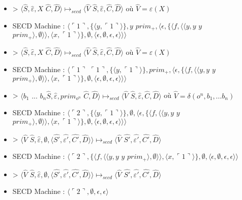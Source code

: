 \documentclass[10pt,a4paper]{article}
\begin{document}
\begin{itemize}
						\item[] > $\langle\widehat{S},\widehat{\varepsilon},X$ $\widehat{C},\widehat{D}\rangle \longmapsto_{secd} \langle \widehat{V}$ $\widehat{S},\widehat{\varepsilon},\widehat{C},\widehat{D}\rangle$ où $\widehat{V} = \varepsilon(X)$
						\item[] SECD Machine : $\langle\ulcorner 1\urcorner,\{\langle y,\ulcorner 1\urcorner\rangle\},y$ $prim_{+},\langle\epsilon,\{\langle f,\langle\langle y,y$ $y$ $prim_{+}\rangle,\emptyset\rangle\rangle,\langle x,\ulcorner 1\urcorner\rangle\} ,\emptyset,\langle\epsilon,\emptyset,\epsilon,\epsilon\rangle\rangle\rangle$
						\item[] > $\langle\widehat{S},\widehat{\varepsilon},X$ $\widehat{C},\widehat{D}\rangle \longmapsto_{secd} \langle \widehat{V}$ $\widehat{S},\widehat{\varepsilon},\widehat{C},\widehat{D}\rangle$ où $\widehat{V} = \varepsilon(X)$
						\item[] SECD Machine : $\langle\ulcorner 1\urcorner$ $\ulcorner 1\urcorner,\{\langle y,\ulcorner 1\urcorner\rangle\},prim_{+},\langle\epsilon,\{\langle f,\langle\langle y,y$ $y$ $prim_{+}\rangle,\emptyset\rangle\rangle,\langle x,\ulcorner 1\urcorner\rangle\} ,\emptyset,\langle\epsilon,\emptyset,\epsilon,\epsilon\rangle\rangle\rangle$
						\item[] > $\langle b_{1}$ $...$ $b_{n}\widehat{S},\widehat{\varepsilon},prim_{o^{n}}$ $\widehat{C},\widehat{D}\rangle \longmapsto_{secd} \langle \widehat{V}$ $\widehat{S},\widehat{\varepsilon},\widehat{C},\widehat{D}\rangle$ où $\widehat{V} = \delta(o^{n},b_1,...b_{n})$
						\item[] SECD Machine : $\langle\ulcorner 2\urcorner,\{\langle y,\ulcorner 1\urcorner\rangle\},\emptyset,\langle\epsilon,\{\langle f,\langle\langle y,y$ $y$ $prim_{+}\rangle,\emptyset\rangle\rangle,\langle x,\ulcorner 1\urcorner\rangle\} ,\emptyset,\langle\epsilon,\emptyset,\epsilon,\epsilon\rangle\rangle\rangle$
						\item[] > $\langle\widehat{V}$ $\widehat{S},\widehat{\varepsilon},\emptyset,\langle\widehat{S'},\widehat{\varepsilon'},\widehat{C'},\widehat{D}\rangle\rangle \longmapsto_{secd} \langle \widehat{V}$ $\widehat{S'},\widehat{\varepsilon'},\widehat{C'},\widehat{D}\rangle$
						\item[] SECD Machine : $\langle\ulcorner 2\urcorner,\{\langle f,\langle\langle y,y$ $y$ $prim_{+}\rangle,\emptyset\rangle\rangle,\langle x,\ulcorner 1\urcorner\rangle\} ,\emptyset,\langle\epsilon,\emptyset,\epsilon,\epsilon\rangle\rangle$
						\item[] > $\langle\widehat{V}$ $\widehat{S},\widehat{\varepsilon},\emptyset,\langle\widehat{S'},\widehat{\varepsilon'},\widehat{C'},\widehat{D}\rangle\rangle \longmapsto_{secd} \langle \widehat{V}$ $\widehat{S'},\widehat{\varepsilon'},\widehat{C'},\widehat{D}\rangle$
						\item[] SECD Machine : $\langle\ulcorner 2\urcorner,\emptyset,\epsilon,\epsilon\rangle$
					\end{itemize}
					\newpage
			
\end{document}
